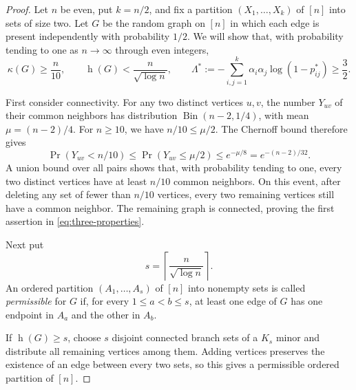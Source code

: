 \documentclass[11pt]{article}
\DeclareMathOperator{\had}{h}
\begin{document}
\begin{proof}
Let $n$ be even, put $k=n/2$, and fix a partition $(X_1,\dots,X_k)$ of $[n]$ into sets of size two. Let $G$ be the random graph on $[n]$ in which each edge is present independently with probability $1/2$. We will show that, with probability tending to one as $n\to\infty$ through even integers,
\begin{equation}\label{eq:three-properties}
 \kappa(G)\ge\frac n{10},
 \qquad
 \had(G)<\frac n{\sqrt{\log n}},
 \qquad
 \Lambda^*:=-\sum_{i,j=1}^k\alpha_i\alpha_j\log(1-p_{ij}^*)\ge\frac32.
\end{equation}

First consider connectivity. For any two distinct vertices $u,v$, the number $Y_{uv}$ of their common neighbors has distribution $\operatorname{Bin}(n-2,1/4)$, with mean $\mu=(n-2)/4$. For $n\ge10$, we have $n/10\le\mu/2$. The Chernoff bound therefore gives
\[
 \Pr(Y_{uv}<n/10)
 \le \Pr(Y_{uv}\le\mu/2)
 \le e^{-\mu/8}
 =e^{-(n-2)/32}.
\]
A union bound over all pairs shows that, with probability tending to one, every two distinct vertices have at least $n/10$ common neighbors. On this event, after deleting any set of fewer than $n/10$ vertices, every two remaining vertices still have a common neighbor. The remaining graph is connected, proving the first assertion in \eqref{eq:three-properties}.

Next put
\[
 s=\left\lceil\frac n{\sqrt{\log n}}\right\rceil.
\]
An ordered partition $(A_1,\dots,A_s)$ of $[n]$ into nonempty sets is called \emph{permissible} for $G$ if, for every $1\le a<b\le s$, at least one edge of $G$ has one endpoint in $A_a$ and the other in $A_b$.

If $\had(G)\ge s$, choose $s$ disjoint connected branch sets of a $K_s$ minor and distribute all remaining vertices among them. Adding vertices preserves the existence of an edge between every two sets, so this gives a permissible ordered partition of $[n]$.


\end{proof}
\end{document}
